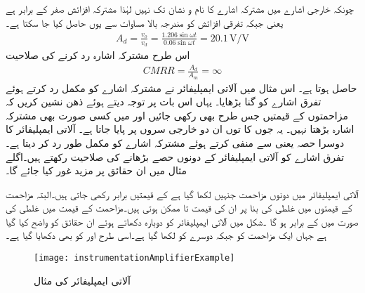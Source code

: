 چونکہ خارجی اشارے میں مشترکہ اشارے کا نام و نشان تک نہیں لہٰذا مشترکہ افزائش صفر کے برابر ہے یعنی  جبکہ تفرقی افزائش کو مندرجہ بالا مساوات سے یوں حاصل کیا جا سکتا ہے۔
\begin{align*}
A_d=\frac{v_o}{v_d}=\frac{1.206 \sin \omega t}{0.06 \sin \omega t}=20.1 \, \si{\volt\per\volt}
\end{align*}
اس طرح مشترکہ اشارہ رد کرنے کی صلاحیت
\begin{align*}
CMRR=\frac{A_d}{A_m}=\infty
\end{align*}
حاصل ہوتا ہے۔
اس مثال میں آلاتی ایمپلیفائر نے مشترکہ اشارے کو مکمل رد کرتے ہوئے تفرق اشارے کو  گنا بڑھایا۔ یہاں اس بات پر توجہ دیتے ہوئے ذھن نشین کریں کہ مزاحمتوں کے قیمتیں جس طرح بھی رکھی جائیں  اور  میں کسی صورت بھی مشترکہ اشارہ بڑھتا نہیں۔ یہ جوں کا توں ان دو خارجی سروں  پر پایا جاتا ہے۔ آلاتی ایمپلیفائر کا دوسرا حصہ یعنی   سے  منفی کرتے ہوئے مشترکہ اشارے کو مکمل طور رد کر دیتا ہے۔ تفرق اشارے کو آلاتی ایمپلیفائر کے دونوں حصے بڑھانے کی صلاحیت رکھتے ہیں۔اگلے مثال میں ان حقائق پر مزید غور کیا جائے گا۔

آلاتی ایمپلیفائر میں دونوں مزاحمت جنہیں  لکھا گیا ہے کے قیمتیں برابر رکھی جاتی ہیں۔البتہ مزاحمت کے قیمتوں میں غلطی کی بنا پر ان کی قیمت
  تا   ممکن ہوتی ہیں۔مزاحمت کے قیمت میں  غلطی کی صورت میں  کے برابر ہو گا ۔شکل  میں آلاتی ایمپلیفائر کو دوبارہ دکھاتے ہوئے ان حقائق کو واضح کیا گیا ہے جہاں ایک مزاحمت کو  جبکہ دوسرے کو  لکھا گیا ہے۔اسی طرح اور  کو بھی دکھایا گیا ہے۔
\begin{figure}
\centering
\texttt{[image: instrumentationAmplifierExample]}
\caption{آلاتی ایمپلیفائر کی مثال}
\label{شکل_آلاتی_ایمپلیفائر_مثال}
\end{figure}

